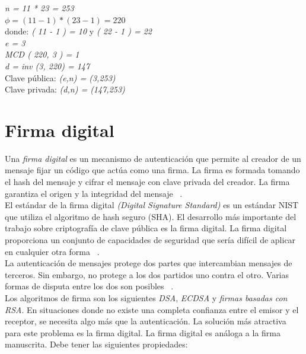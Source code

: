 \textit{n = 11 * 23 = 253} \\ 

\textit{$ \phi = ( 11 - 1 ) * ( 23 - 1 ) = 220 $}\\

donde: \textit{( 11 - 1 ) = 10}   y   \textit{( 22 - 1 ) = 22 }\\

\textit{e = 3} \\

\textit{MCD ( 220, 3 ) = 1} \\

\textit{d = inv (3, 220) = 147 } \\


Clave pública:    \textit{ (e,n) = (3,253) } \\

Clave privada:   \textit { (d,n) = (147,253) } \\



\section{Firma digital}

Una \textit{firma digital} es un mecanismo de autenticación que permite al creador de un mensaje fijar un código que actúa como una firma. La firma es formada tomando el hash del mensaje y cifrar el mensaje con clave privada del creador. La firma garantiza el origen y la integridad del mensaje ~\cite{modes}. \\
El estándar de la firma digital \textit{(Digital Signature Standard)} es un estándar NIST que utiliza el algoritmo de hash seguro (SHA). El desarrollo más importante del trabajo sobre criptografía de clave pública es la firma digital. La firma digital proporciona un conjunto de capacidades de seguridad que sería difícil de aplicar en cualquier otra forma ~\cite{modes}. \\
La autenticación de mensajes protege dos partes que intercambian mensajes de terceros. Sin embargo, no protege a los dos partidos uno contra el otro. Varias formas de disputa entre los dos son posibles ~\cite{modes}. \\
Los algoritmos de firma son los siguientes \textit{DSA}, \textit{ECDSA} y \textit{firmas basadas con RSA}.
En situaciones donde no existe una completa confianza entre el emisor y el receptor, se necesita algo más que la autenticación. La solución más atractiva para este problema es la firma digital. La firma digital es análoga a la firma manuscrita. Debe tener las siguientes propiedades:

